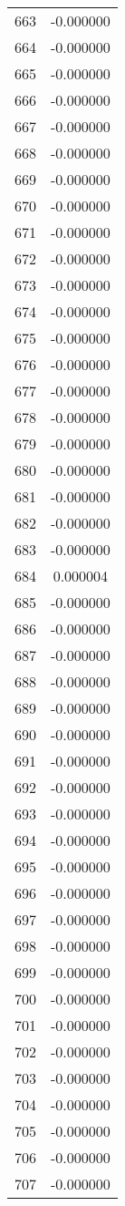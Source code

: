 \documentclass[12pt]{article}
\begin{document}
\begin{longtable}{@{}cc@{}}
663 & -0.000000 \\
664 & -0.000000 \\
665 & -0.000000 \\
666 & -0.000000 \\
667 & -0.000000 \\
668 & -0.000000 \\
669 & -0.000000 \\
670 & -0.000000 \\
671 & -0.000000 \\
672 & -0.000000 \\
673 & -0.000000 \\
674 & -0.000000 \\
675 & -0.000000 \\
676 & -0.000000 \\
677 & -0.000000 \\
678 & -0.000000 \\
679 & -0.000000 \\
680 & -0.000000 \\
681 & -0.000000 \\
682 & -0.000000 \\
683 & -0.000000 \\
684 & 0.000004 \\
685 & -0.000000 \\
686 & -0.000000 \\
687 & -0.000000 \\
688 & -0.000000 \\
689 & -0.000000 \\
690 & -0.000000 \\
691 & -0.000000 \\
692 & -0.000000 \\
693 & -0.000000 \\
694 & -0.000000 \\
695 & -0.000000 \\
696 & -0.000000 \\
697 & -0.000000 \\
698 & -0.000000 \\
699 & -0.000000 \\
700 & -0.000000 \\
701 & -0.000000 \\
702 & -0.000000 \\
703 & -0.000000 \\
704 & -0.000000 \\
705 & -0.000000 \\
706 & -0.000000 \\
707 & -0.000000 \\

\end{longtable}
\end{document}
